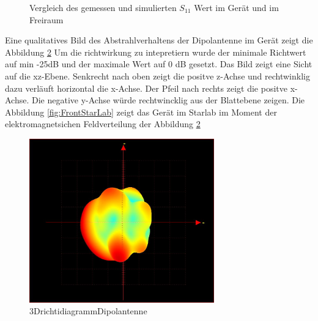 %	

\begin{figure}[!ht]
	\centering
	\begingroup
	
	\endgroup
	\caption{Vergleich des gemessen und simulierten $S_{11}$ Wert im Ger\"at und im Freiraum}	\label{S11_Messung_Simulation_Dipolantenn_Freiraum}
\end{figure}
\newpage
Eine qualitatives Bild des Abstrahlverhaltens der Dipolantenne im Gerät zeigt die Abbildung \ref{fig:3D Richtdiagramm} Um die richtwirkung zu intepretiern wurde der minimale Richtwert auf min -25dB und der maximale Wert auf 0 dB gesetzt. Das Bild zeigt eine Sicht auf die xz-Ebene. Senkrecht nach oben zeigt die positve z-Achse und rechtwinklig dazu verläuft horizontal die x-Achse. Der Pfeil nach rechts zeigt die positve x-Achse. Die negative y-Achse würde rechtwincklig aus der Blattebene zeigen. Die Abbildung \ref{fig:FrontStarLab} zeigt das Gerät im Starlab im Moment der elektromagnetsichen Feldverteilung der Abbildung \ref{fig:3D Richtdiagramm}\\
\begin{figure}[!h]
	\centering
	\includegraphics[width=8cm]{content/bilder/Implementierung/min25_0_x_yhinten_zoben.JPG}%
	\caption{3DrichtidiagrammDipolantenne}
	\label{fig:3D Richtdiagramm}
\end{figure}
